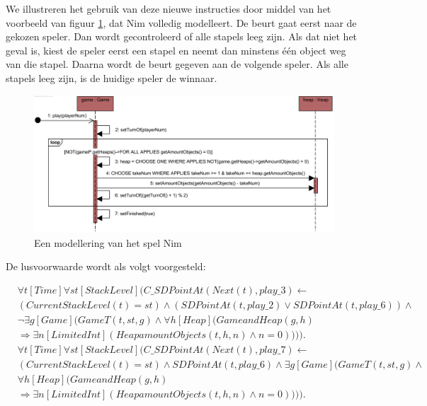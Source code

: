 We illustreren het gebruik van deze nieuwe instructies door middel van het voorbeeld van figuur \ref{fig:new-nim}, dat Nim volledig modelleert. De beurt gaat eerst naar de gekozen speler. Dan wordt gecontroleerd of alle stapels leeg zijn. Als dat niet het geval is, kiest de speler eerst een stapel en neemt dan minstens \'e\'en object weg van die stapel. Daarna wordt de beurt gegeven aan de volgende speler. Als alle stapels leeg zijn, is de huidige speler de winnaar.

\begin{figure}[H]
	\includegraphics[width=\textwidth]{chap-gedrag/seq-new-nim.png}
	\caption{Een modellering van het spel Nim}
	\label{fig:new-nim}
\end{figure}

De lusvoorwaarde wordt als volgt voorgesteld:

\begin{align}
\nonumber &\forall{t}[Time]\forall{st}[StackLevel](C\_SDPointAt(Next(t), play\_3) \leftarrow \\ \nonumber &(CurrentStackLevel(t) = st) \land (SDPointAt(t, play\_2) \lor SDPointAt(t, play\_6)) \land \\ \nonumber &\lnot{}\exists{g}[Game](GameT(t, st, g) \land{}\forall{h}[Heap](GameandHeap(g, h) \\ &\Rightarrow \exists{n}[LimitedInt](HeapamountObjects(t, h, n) \land n = 0)))). \\
\nonumber &\forall{t}[Time]\forall{st}[StackLevel](C\_SDPointAt(Next(t), play\_7) \leftarrow \\ \nonumber &(CurrentStackLevel(t) = st) \land SDPointAt(t, play\_6) \land \exists{g}[Game](GameT(t, st, g) \land \\ \nonumber &\forall{h}[Heap](GameandHeap(g, h) \\ &\Rightarrow \exists{n}[LimitedInt](HeapamountObjects(t, h, n) \land n = 0)))).
\end{align}

